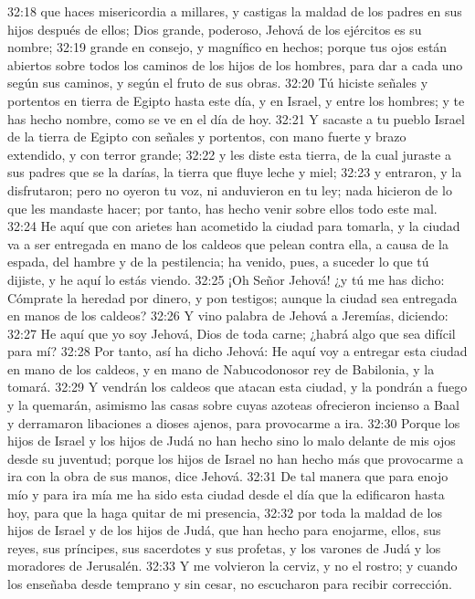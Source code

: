 32:18 que haces misericordia a millares, y castigas la maldad de los padres en sus hijos después de ellos; Dios grande, poderoso, Jehová de los ejércitos es su nombre;  
32:19 grande en consejo, y magnífico en hechos; porque tus ojos están abiertos sobre todos los caminos de los hijos de los hombres, para dar a cada uno según sus caminos, y según el fruto de sus obras.  
32:20 Tú hiciste señales y portentos en tierra de Egipto hasta este día, y en Israel, y entre los hombres; y te has hecho nombre, como se ve en el día de hoy.  
32:21 Y sacaste a tu pueblo Israel de la tierra de Egipto con señales y portentos, con mano fuerte y brazo extendido, y con terror grande;  
32:22 y les diste esta tierra, de la cual juraste a sus padres que se la darías, la tierra que fluye leche y miel;  
32:23 y entraron, y la disfrutaron; pero no oyeron tu voz, ni anduvieron en tu ley; nada hicieron de lo que les mandaste hacer; por tanto, has hecho venir sobre ellos todo este mal.  
32:24 He aquí que con arietes han acometido la ciudad para tomarla, y la ciudad va a ser entregada en mano de los caldeos que pelean contra ella, a causa de la espada, del hambre y de la pestilencia; ha venido, pues, a suceder lo que tú dijiste, y he aquí lo estás viendo.  
32:25 ¡Oh Señor Jehová! ¿y tú me has dicho: Cómprate la heredad por dinero, y pon testigos; aunque la ciudad sea entregada en manos de los caldeos?  
32:26 Y vino palabra de Jehová a Jeremías, diciendo:  
32:27 He aquí que yo soy Jehová, Dios de toda carne; ¿habrá algo que sea difícil para mí?  
32:28 Por tanto, así ha dicho Jehová: He aquí voy a entregar esta ciudad en mano de los caldeos, y en mano de Nabucodonosor rey de Babilonia, y la tomará. 
32:29 Y vendrán los caldeos que atacan esta ciudad, y la pondrán a fuego y la quemarán, asimismo las casas sobre cuyas azoteas ofrecieron incienso a Baal y derramaron libaciones a dioses ajenos, para provocarme a ira.  
32:30 Porque los hijos de Israel y los hijos de Judá no han hecho sino lo malo delante de mis ojos desde su juventud; porque los hijos de Israel no han hecho más que provocarme a ira con la obra de sus manos, dice Jehová.  
32:31 De tal manera que para enojo mío y para ira mía me ha sido esta ciudad desde el día que la edificaron hasta hoy, para que la haga quitar de mi presencia,  
32:32 por toda la maldad de los hijos de Israel y de los hijos de Judá, que han hecho para enojarme, ellos, sus reyes, sus príncipes, sus sacerdotes y sus profetas, y los varones de Judá y los moradores de Jerusalén.  
32:33 Y me volvieron la cerviz, y no el rostro; y cuando los enseñaba desde temprano y sin cesar, no escucharon para recibir corrección.  
